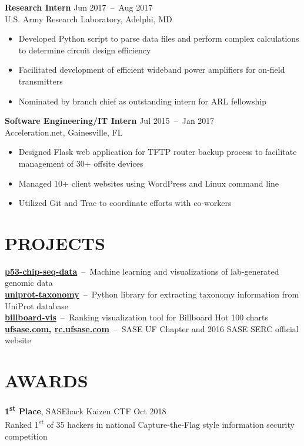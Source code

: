\documentclass[line,resmargin]{res}
\begin{document}
\begin{resume}
    \textbf{Research Intern}    \hfill Jun 2017~--~Aug 2017 \\
    U.S. Army Research Laboratory, Adelphi, MD
    \begin{itemize}  \itemsep -2pt
        \item Developed Python script to parse data files and perform complex calculations to determine circuit design efficiency
        \item Facilitated development of efficient wideband power amplifiers for on-field transmitters
        \item Nominated by branch chief as outstanding intern for ARL fellowship
    \end{itemize}

    \textbf{Software Engineering/IT Intern}    \hfill Jul 2015~--~Jan 2017 \\
    Acceleration.net, Gainesville, FL
    \begin{itemize}  \itemsep -2pt
        \item Designed Flask web application for TFTP router backup process to facilitate management of 30+ offsite devices
        \item Managed 10+ client websites using WordPress and Linux command line
        \item Utilized Git and Trac to coordinate efforts with co-workers
    \end{itemize}

\section{PROJECTS}
    \textbf{\href{https://github.com/zhoulab/p53-chip-seq-data}{p53-chip-seq-data}}~--~Machine learning and visualizations of lab-generated genomic data \\
    \textbf{\href{https://github.com/zhoulab/uniprot-taxonomy}{uniprot-taxonomy}}~--~Python library for extracting taxonomy information from UniProt database \\
    \textbf{\href{https://victorl.in/billboard-vis}{billboard-vis}}~--~Ranking visualization tool for Billboard Hot 100 charts \\
    \textbf{\href{http://ufsase.com}{ufsase.com}, \href{http://rc.ufsase.com}{rc.ufsase.com}}~--~SASE UF Chapter and 2016 SASE SERC official website

\section{AWARDS}
    \textbf{1\textsuperscript{st} Place}, SASEhack Kaizen CTF    \hfill Oct 2018 \\
    Ranked 1\textsuperscript{st} of 35 hackers in national Capture-the-Flag style information security competition


\end{resume}
\end{document}
